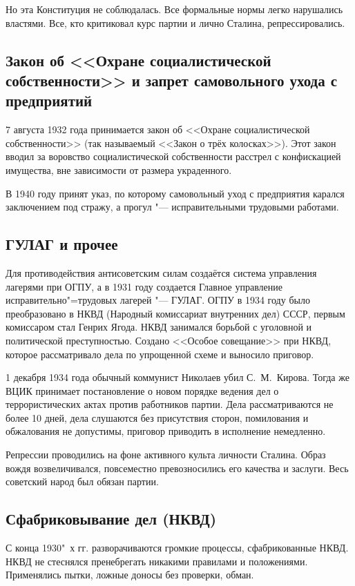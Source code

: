 Но эта Конституция не соблюдалась. Все формальные нормы легко нарушались властями. Все, кто критиковал курс партии и лично Сталина, репрессировались.

\subsection{Закон об <<Охране социалистической собственности>> и запрет самовольного ухода с предприятий}

7 августа 1932 года принимается закон об <<Охране социалистической собственности>> (так называемый <<Закон о трёх колосках>>). Этот закон вводил за воровство социалистической собственности расстрел с конфискацией имущества, вне зависимости от размера украденного.

В 1940 году принят указ, по которому самовольный уход с предприятия карался заключением под стражу, а прогул "--- исправительными трудовыми работами.

\subsection{ГУЛАГ и прочее}

Для противодействия антисоветским силам создаётся система управления лагерями при ОГПУ, а в 1931 году создается Главное управление исправительно"=трудовых лагерей "--- ГУЛАГ. ОГПУ в 1934 году было преобразовано в НКВД (Народный комиссариат внутренних дел) СССР, первым комиссаром стал Генрих Ягода. НКВД занимался борьбой с уголовной и политической преступностью. Создано <<Особое совещание>> при НКВД, которое рассматривало дела по упрощенной схеме и выносило приговор.

1 декабря 1934 года обычный коммунист Николаев убил С.~М.~Кирова. Тогда же ВЦИК принимает постановление о новом порядке ведения дел о террористических актах против работников партии. Дела рассматриваются не более 10 дней, дела слушаются без присутствия сторон, помилования и обжалования не допустимы, приговор приводить в исполнение немедленно.

Репрессии проводились на фоне активного культа личности Сталина. Образ вождя возвеличивался, повсеместно превозносились его качества и заслуги. Весь советский народ был обязан партии.

\subsection{Сфабриковывание дел (НКВД)}

С конца 1930"~х гг. разворачиваются громкие процессы, сфабрикованные НКВД. НКВД не стеснялся пренебрегать никакими правилами и положениями. Применялись пытки, ложные доносы без проверки, обман. 

